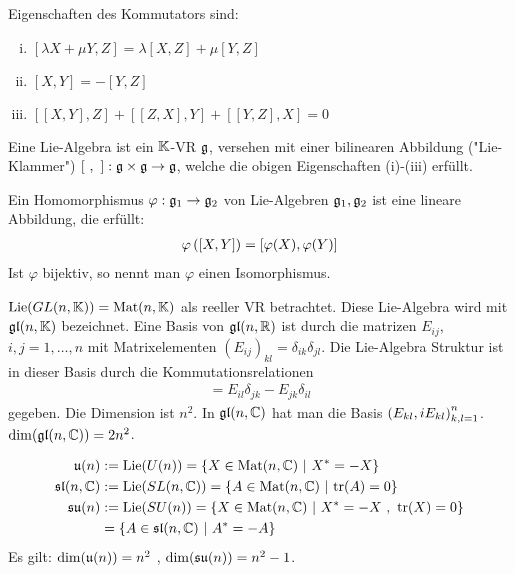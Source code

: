 \begin{lemma}
    Eigenschaften des Kommutators sind:
    \begin{enumerate}[(i)]
        \item $[\lambda X + \mu Y,Z] = \lambda[X,Z] + \mu[Y,Z]$
        \item $[X,Y] = - [Y,Z]$
        \item $[[X,Y],Z] + [[Z,X],Y] + [[Y,Z],X] = 0$
    \end{enumerate}
\end{lemma}

\begin{definition}
    Eine Lie-Algebra ist ein $\mathbb{K}$-VR $\mathfrak{g}$, versehen mit einer bilinearen
    Abbildung ("Lie-Klammer") $[ \ , \ ]: \mathfrak{g} \times \mathfrak{g} \rightarrow \mathfrak{g}$,
    welche die obigen Eigenschaften (i)-(iii) erfüllt.
\end{definition}

\begin{definition}[Homomorphismus]
    Ein Homomorphismus $\varphi: \mathfrak{g}_1 \rightarrow \mathfrak{g}_2$ von Lie-Algebren $\mathfrak{g}_1,
    \mathfrak{g}_2$ ist eine lineare Abbildung, die erfüllt:
    \begin{align*}
        \varphi \left( [X,Y] \right) = [\varphi(X),\varphi(Y)]
    \end{align*}
    Ist $\varphi$ bijektiv, so nennt man $\varphi$ einen Isomorphismus.
\end{definition}

\begin{beispiel}
    $\text{Lie}(GL(n,\mathbb{K})) = \text{Mat}(n,\mathbb{K})$ als reeller VR betrachtet. Diese
    Lie-Algebra wird mit $\mathfrak{gl}(n,\mathbb{K})$ bezeichnet. Eine Basis von $\mathfrak{gl}(n,\mathbb{R})$
    ist durch die matrizen $E_{ij}$, $i,j=1,\dots,n$ mit Matrixelementen
    $(E_{ij})_{kl} = \delta_{ik} \delta_{jl}$. Die Lie-Algebra Struktur
    ist in dieser Basis durch die Kommutationsrelationen
    \begin{align*}
        [E_{ij},E_{kl}] = E_{il} \delta_{jk} - E_{jk} \delta_{il}
    \end{align*}
    gegeben. Die Dimension ist $n^2$. In $\mathfrak{gl}(n,\mathbb{C})$ hat man die Basis
    $\left( E_{kl},i E_{kl} \right)_{k,l=1}^n$. $\dim(\mathfrak{gl}(n,\mathbb{C})) = 2 n^2$.
\end{beispiel}

\begin{lemma}
    \begin{align*}
        \mathfrak{u}(n) &:= \text{Lie}(U(n)) = \left\{ X \in \text{Mat}(n,\mathbb{C}) \ | \ X^\ast = -X \right\}
        \\
        \mathfrak{sl}(n,\mathbb{C}) &:= \text{Lie}(SL(n,\mathbb{C})) = \left\{ A \in \text{Mat}(n,\mathbb{C}) \ | \ \text{tr}(A) = 0 \right\}
        \\
        \mathfrak{su}(n) &:= \text{Lie}(SU(n)) = \left\{ X \in \text{Mat}(n,\mathbb{C}) \ | \ X^\ast = -X \ , \ \text{tr}(X) = 0 \right\}
        \\
        &= \left\{ A \in \mathfrak{sl}(n,\mathbb{C}) \ | \ A^\ast = - A \right\}
    \end{align*}
    Es gilt: $\dim(\mathfrak{u}(n)) = n^2$ , $\dim(\mathfrak{su}(n)) = n^2 - 1$.
\end{lemma}

